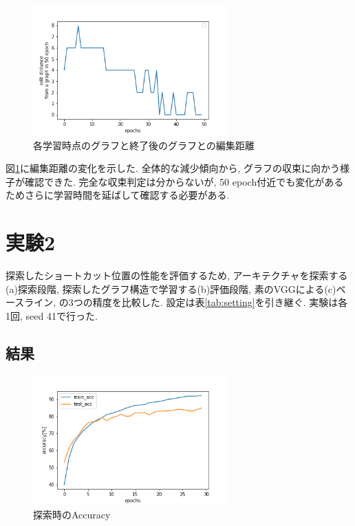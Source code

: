 \documentclass[twocolumn]{jarticle}     %
\begin{document}
\begin{figure}[tb]
	\begin{center}
		\includegraphics[clip,width=75mm]{graph.png}
		\caption{各学習時点のグラフと終了後のグラフとの編集距離}
		\label{fig:edit}
	\end{center}
\end{figure}

図\ref{fig:edit}に編集距離の変化を示した.
全体的な減少傾向から, グラフの収束に向かう様子が確認できた.
完全な収束判定は分からないが, 50 epoch付近でも変化があるためさらに学習時間を延ばして確認する必要がある.

\section{実験2}

探索したショートカット位置の性能を評価するため, アーキテクチャを探索する(a)探索段階, 探索したグラフ構造で学習する(b)評価段階, 素のVGGによる(c)ベースライン, の3つの精度を比較した.
設定は表\ref{tab:setting}を引き継ぐ.
実験は各1回, seed 41で行った.

\subsection{結果}

\begin{figure}[tb]
	\begin{center}
		\includegraphics[clip,width=75mm]{search_acc.png}
		\caption{探索時のAccuracy}
		\label{fig:search_acc}
	\end{center}
\end{figure}
\end{document}
